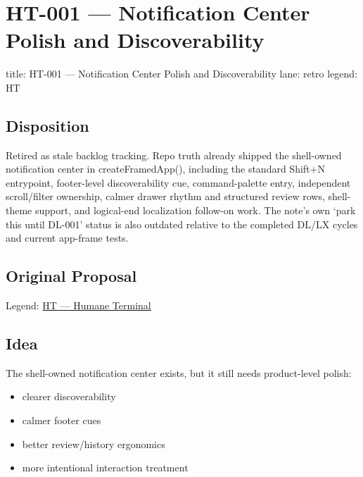 \chapter{HT-001 --- Notification Center Polish and Discoverability}\label{record-351}

\smallskip

\begin{RecordMeta}
title: HT-001 — Notification Center Polish and Discoverability
lane: retro
legend: HT

\end{RecordMeta}

\section{Disposition}\label{record-351-disposition}

Retired as stale backlog tracking. Repo truth already shipped the shell-owned notification center in createFramedApp(), including the standard Shift+N entrypoint, footer-level discoverability cue, command-palette entry, independent scroll/filter ownership, calmer drawer rhythm and structured review rows, shell-theme support, and logical-end localization follow-on work. The note's own `park this until DL-001' status is also outdated relative to the completed DL/LX cycles and current app-frame tests.

\section{Original Proposal}\label{record-351-original-proposal}

Legend: \href{https://github.com/flyingrobots/bijou/blob/1853ad902f6bf219326409e7f743a5a1d6517dbc/docs/method/legends/HT-humane-terminal.md}{HT --- Humane Terminal}

\section{Idea}\label{record-351-idea}

The shell-owned notification center exists, but it still needs product-level polish:

\begin{itemize}
\tightlist
\item
  clearer discoverability
\item
  calmer footer cues
\item
  better review/history ergonomics
\item
  more intentional interaction treatment
\end{itemize}

